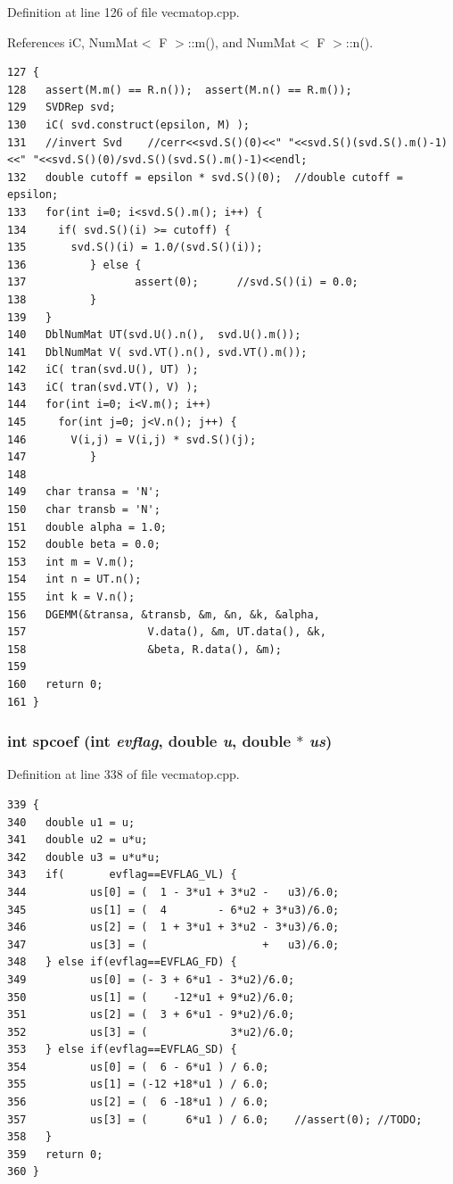 Definition at line 126 of file vecmatop.cpp.

References i\-C, Num\-Mat$<$ F $>$::m(), and Num\-Mat$<$ F $>$::n().

\footnotesize\begin{verbatim}127 {
128   assert(M.m() == R.n());  assert(M.n() == R.m());
129   SVDRep svd;
130   iC( svd.construct(epsilon, M) );
131   //invert Svd    //cerr<<svd.S()(0)<<" "<<svd.S()(svd.S().m()-1)<<" "<<svd.S()(0)/svd.S()(svd.S().m()-1)<<endl;
132   double cutoff = epsilon * svd.S()(0);  //double cutoff = epsilon;
133   for(int i=0; i<svd.S().m(); i++) {
134     if( svd.S()(i) >= cutoff) {
135       svd.S()(i) = 1.0/(svd.S()(i));
136          } else {
137                 assert(0);      //svd.S()(i) = 0.0;
138          }
139   }
140   DblNumMat UT(svd.U().n(),  svd.U().m());
141   DblNumMat V( svd.VT().n(), svd.VT().m());
142   iC( tran(svd.U(), UT) );
143   iC( tran(svd.VT(), V) );
144   for(int i=0; i<V.m(); i++)
145     for(int j=0; j<V.n(); j++) {
146       V(i,j) = V(i,j) * svd.S()(j);
147          }
148   
149   char transa = 'N';
150   char transb = 'N';
151   double alpha = 1.0;
152   double beta = 0.0;
153   int m = V.m();
154   int n = UT.n();
155   int k = V.n();
156   DGEMM(&transa, &transb, &m, &n, &k, &alpha,
157                   V.data(), &m, UT.data(), &k, 
158                   &beta, R.data(), &m);  
159   
160   return 0;
161 }
\end{verbatim}\normalsize 


\subsubsection{\setlength{\rightskip}{0pt plus 5cm}int spcoef (int {\em evflag}, double {\em u}, double $\ast$ {\em us})}\label{vecmatop_8cpp_9084d4f8c569a1ae492c9b1f315df7c1_9084d4f8c569a1ae492c9b1f315df7c1}




Definition at line 338 of file vecmatop.cpp.

\footnotesize\begin{verbatim}339 {
340   double u1 = u;
341   double u2 = u*u;
342   double u3 = u*u*u;
343   if(       evflag==EVFLAG_VL) {
344          us[0] = (  1 - 3*u1 + 3*u2 -   u3)/6.0;
345          us[1] = (  4        - 6*u2 + 3*u3)/6.0;
346          us[2] = (  1 + 3*u1 + 3*u2 - 3*u3)/6.0;
347          us[3] = (                  +   u3)/6.0;
348   } else if(evflag==EVFLAG_FD) {
349          us[0] = (- 3 + 6*u1 - 3*u2)/6.0;
350          us[1] = (    -12*u1 + 9*u2)/6.0;
351          us[2] = (  3 + 6*u1 - 9*u2)/6.0;
352          us[3] = (             3*u2)/6.0;
353   } else if(evflag==EVFLAG_SD) {
354          us[0] = (  6 - 6*u1 ) / 6.0;
355          us[1] = (-12 +18*u1 ) / 6.0;
356          us[2] = (  6 -18*u1 ) / 6.0;
357          us[3] = (      6*u1 ) / 6.0;    //assert(0); //TODO;
358   }  
359   return 0;
360 }
\end{verbatim}\normalsize 


